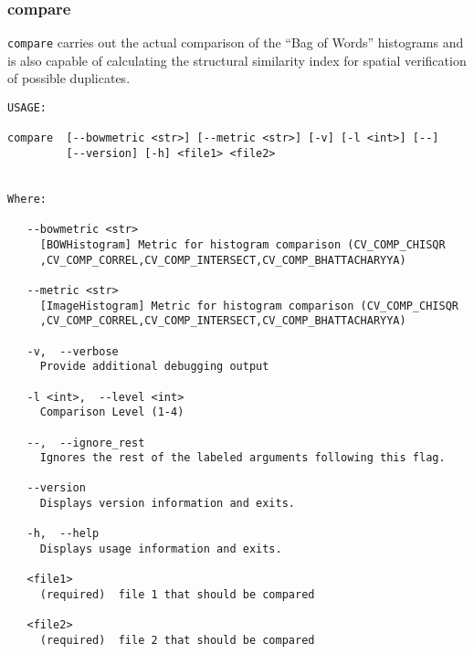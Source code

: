 \subsubsection{compare}

\texttt{compare} carries out the actual comparison of the ``Bag of Words''
histograms and is also capable of calculating the structural similarity index
for spatial verification of possible duplicates.

\begin{verbatim}
USAGE: 

compare  [--bowmetric <str>] [--metric <str>] [-v] [-l <int>] [--]
         [--version] [-h] <file1> <file2>


Where: 

   --bowmetric <str>
     [BOWHistogram] Metric for histogram comparison (CV_COMP_CHISQR
     ,CV_COMP_CORREL,CV_COMP_INTERSECT,CV_COMP_BHATTACHARYYA)

   --metric <str>
     [ImageHistogram] Metric for histogram comparison (CV_COMP_CHISQR
     ,CV_COMP_CORREL,CV_COMP_INTERSECT,CV_COMP_BHATTACHARYYA)

   -v,  --verbose
     Provide additional debugging output

   -l <int>,  --level <int>
     Comparison Level (1-4)

   --,  --ignore_rest
     Ignores the rest of the labeled arguments following this flag.

   --version
     Displays version information and exits.

   -h,  --help
     Displays usage information and exits.

   <file1>
     (required)  file 1 that should be compared

   <file2>
     (required)  file 2 that should be compared
\end{verbatim}